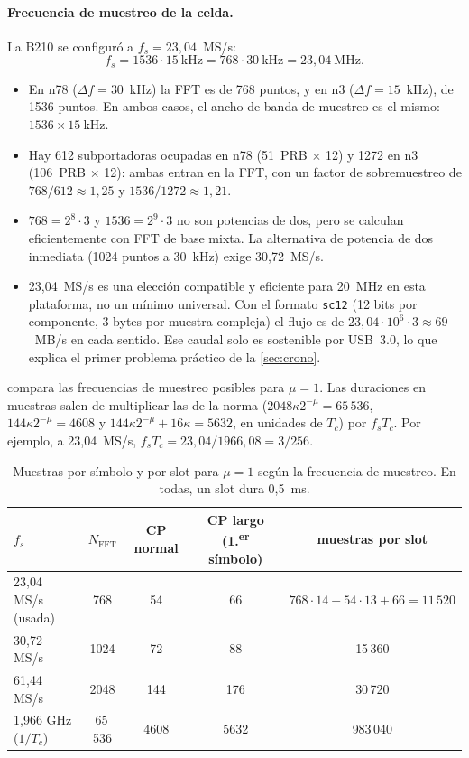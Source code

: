 \paragraph{Frecuencia de muestreo de la celda.} La B210 se configuró a $f_s = 23{,}04$~MS/s:
\begin{equation}
f_s = 1536\cdot 15~\text{kHz} = 768\cdot 30~\text{kHz} = 23{,}04~\text{MHz}.
\label{eq:fs_celda}
\end{equation}
\begin{itemize}
  \item En n78 ($\Delta f = 30$~kHz) la FFT es de 768 puntos, y en n3 ($\Delta f=15$~kHz), de 1536 puntos. En ambos casos, el ancho de banda de muestreo es el mismo: $1536\times 15~\text{kHz}$.
  \item Hay 612 subportadoras ocupadas en n78 (51~PRB $\times$ 12) y 1272 en n3 (106~PRB $\times$ 12): ambas entran en la FFT, con un factor de sobremuestreo de $768/612 \approx 1{,}25$ y $1536/1272\approx 1{,}21$.
  \item $768 = 2^8\cdot 3$ y $1536 = 2^9\cdot 3$ no son potencias de dos, pero se calculan eficientemente con FFT de base mixta. La alternativa de potencia de dos inmediata (1024 puntos a 30~kHz) exige 30,72~MS/s.
  \item 23,04~MS/s es una elección compatible y eficiente para 20~MHz en esta plataforma, no un mínimo universal. Con el formato \texttt{sc12} (12 bits por componente, 3 bytes por muestra compleja) el flujo es de $23{,}04\cdot 10^6\cdot 3 \approx 69$~MB/s en cada sentido. Ese caudal solo es sostenible por USB~3.0, lo que explica el primer problema práctico de la \cref{sec:crono}.
\end{itemize}

 compara las frecuencias de muestreo posibles para $\mu=1$. Las duraciones en muestras salen de multiplicar las de la norma ($2048\kappa 2^{-\mu} = 65\,536$, $144\kappa 2^{-\mu} = 4608$ y $144\kappa 2^{-\mu}+16\kappa = 5632$, en unidades de $T_c$) por $f_s T_c$. Por ejemplo, a 23,04~MS/s, $f_s T_c = 23{,}04/1966{,}08 = 3/256$.

\begin{table}[htbp]
\centering
\caption{Muestras por símbolo y por slot para $\mu=1$ según la frecuencia de muestreo. En todas, un slot dura 0,5~ms.}
\label{tab:fs}
\begin{tabular}{lcccc}
\toprule
$f_s$ & $N_\text{FFT}$ & CP normal & CP largo (1.\textsuperscript{er} símbolo) & muestras por slot \\
\midrule
\rowcolor{azul!10} 23,04 MS/s (usada) & 768 & 54 & 66 & $768\cdot14+54\cdot13+66 = 11\,520$ \\
30,72 MS/s & 1024 & 72 & 88 & 15\,360 \\
61,44 MS/s & 2048 & 144 & 176 & 30\,720 \\
1,966 GHz ($1/T_c$) & 65\,536 & 4608 & 5632 & 983\,040 \\
\bottomrule
\end{tabular}
\end{table}

